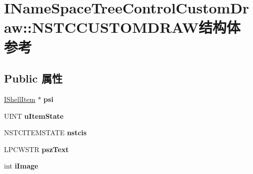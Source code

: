 \hypertarget{struct_i_name_space_tree_control_custom_draw_1_1_n_s_t_c_c_u_s_t_o_m_d_r_a_w}{}\section{I\+Name\+Space\+Tree\+Control\+Custom\+Draw\+:\+:N\+S\+T\+C\+C\+U\+S\+T\+O\+M\+D\+R\+A\+W结构体 参考}
\label{struct_i_name_space_tree_control_custom_draw_1_1_n_s_t_c_c_u_s_t_o_m_d_r_a_w}
\subsection*{Public 属性}
\begin{DoxyCompactItemize}
\item 
\mbox{\label{struct_i_name_space_tree_control_custom_draw_1_1_n_s_t_c_c_u_s_t_o_m_d_r_a_w_ad8cb2c0f487d37096ca47fe235744804}} 
\hyperlink{interface_i_shell_item}{I\+Shell\+Item} $\ast$ {\bfseries psi}
\item 
\mbox{\label{struct_i_name_space_tree_control_custom_draw_1_1_n_s_t_c_c_u_s_t_o_m_d_r_a_w_a78d90266e5b612c6474c2fd8d615c9ba}} 
U\+I\+NT {\bfseries u\+Item\+State}
\item 
\mbox{\label{struct_i_name_space_tree_control_custom_draw_1_1_n_s_t_c_c_u_s_t_o_m_d_r_a_w_a50d571cb361ae9687bbd45df83526443}} 
N\+S\+T\+C\+I\+T\+E\+M\+S\+T\+A\+TE {\bfseries nstcis}
\item 
\mbox{\label{struct_i_name_space_tree_control_custom_draw_1_1_n_s_t_c_c_u_s_t_o_m_d_r_a_w_a6611f02ef17079df97c1c2c452bfbe41}} 
L\+P\+C\+W\+S\+TR {\bfseries psz\+Text}
\item 
\mbox{\label{struct_i_name_space_tree_control_custom_draw_1_1_n_s_t_c_c_u_s_t_o_m_d_r_a_w_a1666c2148740c5a7d1eef233bce31e43}} 
int {\bfseries i\+Image}

\end{DoxyCompactItemize}
